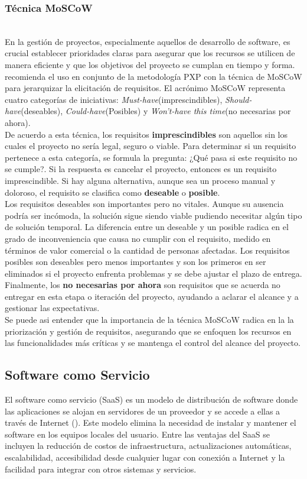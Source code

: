 \subsubsection{Técnica MoSCoW}\hfill\\ 
\indent
En la gestión de proyectos, especialmente aquellos de desarrollo de software, es crucial establecer prioridades claras para asegurar que los recursos se utilicen de manera eficiente y que los objetivos del proyecto se cumplan en tiempo y forma. \textcite{marthasari2018personal} recomienda el uso en conjunto de la metodología PXP con la técnica de MoSCoW para jerarquizar la elicitación de requisitos. El acrónimo MoSCoW representa cuatro categorías de iniciativas: \textit{Must-have}(imprescindibles), \textit{Should-have}(deseables), \textit{Could-have}(Posibles) y  \textit{Won’t-have this time}(no necesarias por ahora). \\  \indent
De acuerdo a esta técnica, los requisitos \textbf{imprescindibles} son aquellos sin los cuales el proyecto no sería legal, seguro o viable. Para determinar si un requisito pertenece a esta categoría, se formula la pregunta: ¿Qué pasa si este requisito no se cumple?. Si la respuesta es cancelar el proyecto, entonces es un requisito imprescindible. Si hay alguna alternativa, aunque sea un proceso manual y doloroso, el requisito se clasifica como \textbf{deseable} o \textbf{posible}.
\\ \noindent
Los requisitos deseables son importantes pero no vitales. Aunque su ausencia podría ser incómoda, la solución sigue siendo viable pudiendo necesitar algún tipo de solución temporal. La diferencia entre un deseable y un posible radica en el grado de inconveniencia que causa no cumplir con el requisito, medido en términos de valor comercial o la cantidad de personas afectadas. Los requisitos posibles son deseables pero menos importantes y son los primeros en ser eliminados si el proyecto enfrenta problemas y se debe ajustar el plazo de entrega. Finalmente, los \textbf{no necesarias por ahora} son requisitos que se acuerda no entregar en esta etapa o iteración del proyecto, ayudando a aclarar el alcance y a gestionar las expectativas.\\
Se puede asi entender que la importancia de la técnica MoSCoW radica en la la priorización y gestión de requisitos, asegurando que se enfoquen los recursos en las funcionalidades más críticas y se mantenga el control del alcance del proyecto.

\subsection{Software como Servicio}
El software como servicio (SaaS) es un modelo de distribución de software donde las aplicaciones se alojan en servidores de un proveedor y se accede a ellas a través de Internet (\cite{villamor2017}). Este modelo elimina la necesidad de instalar y mantener el software en los equipos locales del usuario. Entre las ventajas del SaaS se incluyen la reducción de costos de infraestructura, actualizaciones automáticas, escalabilidad, accesibilidad desde cualquier lugar con conexión a Internet y la facilidad para integrar con otros sistemas y servicios.

